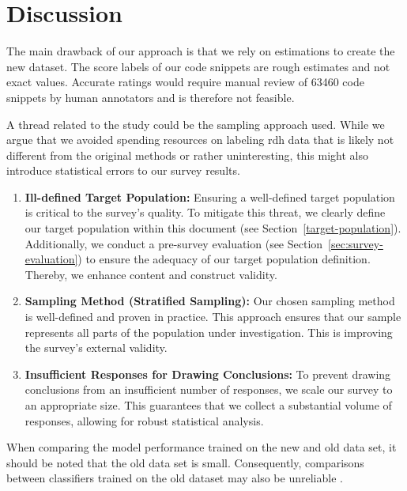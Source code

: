 \documentclass[%
class=scrreprt,
chapterprefix=false,%
open=right,%
twoside=false,%
paper=a4,%
logofile={Logo\_zentral\_farbig\_EN.png},%
thesistype=master,%
UKenglish,%
]{se2thesis}
\theoremstyle{definition}
\begin{document}
\section{Discussion} \label{Discussion}

	The main drawback of our approach is that we rely on estimations to create the new dataset. The score labels of our code snippets are rough estimates and not exact values. Accurate ratings would require manual review of 63460 code snippets by human annotators and is therefore not feasible.
	
	A thread related to the study could be the sampling approach used. While we argue that we avoided spending resources on labeling rdh data that is likely not different from the original methods or rather uninteresting, this might also introduce statistical errors to our survey results.
	
	\begin{enumerate}
		\item \textbf{Ill-defined Target Population:} Ensuring a well-defined target population is critical to the survey's quality. To mitigate this threat, we clearly define our target population within this document (see Section~\ref{target-population}). Additionally, we conduct a pre-survey evaluation (see Section~\ref{sec:survey-evaluation}) to ensure the adequacy of our target population definition. Thereby, we enhance content and construct validity.
		
		\item \textbf{Sampling Method (Stratified Sampling):} Our chosen sampling method is well-defined and proven in practice. This approach ensures that our sample represents all parts of the population under investigation. This is improving the survey's external validity.
		
		\item \textbf{Insufficient Responses for Drawing Conclusions:} To prevent drawing conclusions from an insufficient number of responses, we scale our survey to an appropriate size. This guarantees that we collect a substantial volume of responses, allowing for robust statistical analysis.
	\end{enumerate}
	
	When comparing the model performance trained on the new and old data set, it should be noted that the old data set is small. Consequently, comparisons between classifiers trained on the old dataset may also be unreliable \cite{mi2022towards}.
	
\end{document}
